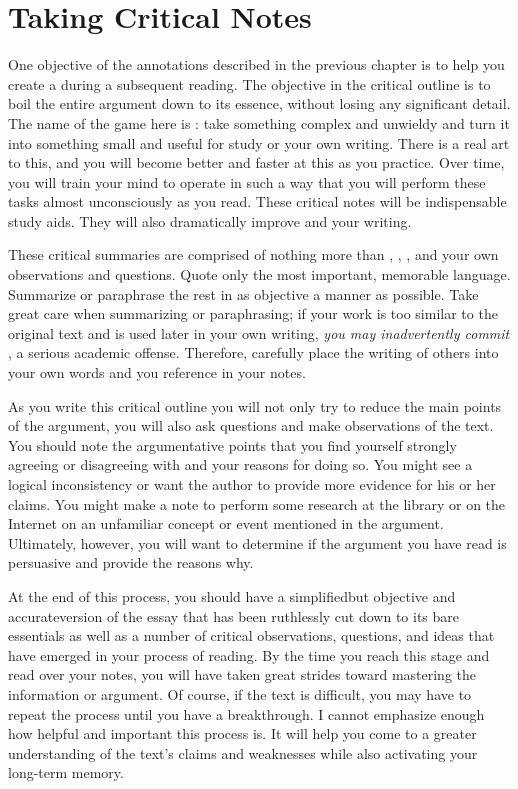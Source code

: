 \section{Taking Critical Notes}

One objective of the annotations described in the previous chapter is to help you create a  during a subsequent reading. The objective in the critical
outline is to boil the entire argument down to its essence, without losing any
significant detail. The name of the game here is : take
something complex and unwieldy and turn it into something small and useful for
study or your own writing. There is a real art to this, and you will become
better and faster at this as you practice. Over time, you will train your mind
to operate in such a way that you will perform these tasks almost unconsciously
as you read. These critical notes will be indispensable study aids. They will
also dramatically improve and your writing.

These critical summaries are comprised of nothing more than \hyperlink{summary}{\color{Ahrenge}{summary}}, \hyperlink{paraphrase}{\color{Ahrenge}{paraphrase}}, \hyperlink{quotation}{\color{Ahrenge}{quotation}}, and your own observations and
questions. Quote only the most important, memorable language. Summarize or
paraphrase the rest in as objective a manner as possible. Take great care when
summarizing or paraphrasing; if your work is too similar to the original text
and is used later in your own writing, \emph{you may inadvertently commit
\hyperlink{plagiarism}{\color{Ahrenge}{plagiarism}}}, a serious academic
offense. Therefore, carefully place the writing of others into your own words
and \hyperlink{citation}{\color{Ahrenge}{cite the page numbers}} you reference in your notes.

As you write this critical outline you will not only try to reduce the main
points of the argument, you will also ask questions and make observations of the
text. You should note the argumentative points that you find yourself strongly
agreeing or disagreeing with and your reasons for doing so. You might see a
logical inconsistency or want the author to provide more evidence for his or her
claims. You might make a note to perform some research at the library or on the
Internet on an unfamiliar concept or event mentioned in the argument.
Ultimately, however, you will want to determine if the argument you have read is
persuasive and provide the reasons why.

At the end of this process, you should have a simplified\textemdash but
objective and accurate\textemdash version of the essay that has been ruthlessly
cut down to its bare essentials as well as a number of critical observations,
questions, and ideas that have emerged in your process of reading. By the time
you reach this stage and read over your notes, you will have taken great strides
toward mastering the information or argument. Of course, if the text is difficult, you may have to repeat the process until you have a breakthrough. I cannot emphasize enough how helpful and important this process is. It will help you come to a greater understanding of the text’s claims and weaknesses while also activating your long-term memory. 

